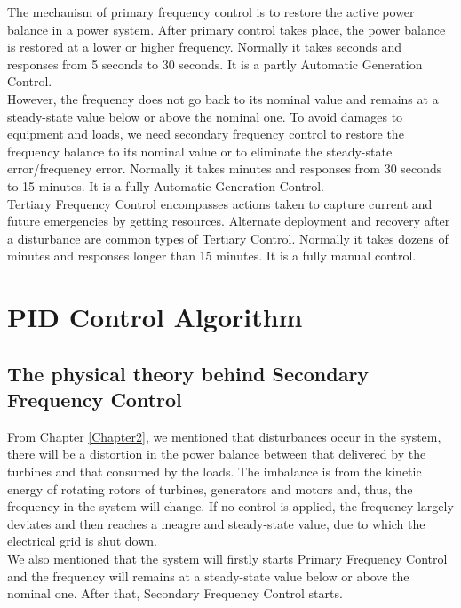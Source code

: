 \documentclass{report}
\begin{document}
The mechanism of primary frequency control is to restore the active power balance in a power system. After primary control takes place, the power balance is restored at a lower or higher frequency. Normally it takes seconds and responses from 5 seconds to 30 seconds. It is a partly Automatic Generation Control.\\


However, the frequency does not go back to its nominal value and remains at a steady-state value below or above the nominal one. To avoid damages to equipment and loads, we need secondary frequency control to restore the frequency balance to its nominal value or to eliminate the steady-state error/frequency error. Normally it takes minutes and responses from 30 seconds to 15 minutes. It is a fully Automatic Generation Control.\\


Tertiary Frequency Control encompasses actions taken to capture current and future emergencies by getting resources. Alternate deployment and recovery after a disturbance are common types of Tertiary Control. Normally it takes dozens of minutes and responses longer than 15 minutes. It is a fully manual control.



\chapter{PID Control Algorithm}
\label{Chapter3}
\section{The physical theory behind Secondary Frequency Control} %
From Chapter \textcolor{red}{\ref{Chapter2}}, we mentioned that disturbances occur in the system, there will be a distortion in the power balance between that delivered by the turbines and that consumed by the loads. The imbalance is from the kinetic energy of rotating rotors of turbines, generators and motors and, thus, the frequency in the system will change. If no control is applied, the frequency largely deviates and then reaches a meagre and steady-state value, due to which the electrical grid is shut down. \\

We also mentioned that the system will firstly starts Primary Frequency Control and the frequency will remains at a steady-state value below or above the nominal one. After that, Secondary Frequency Control starts.\\
\end{document}
